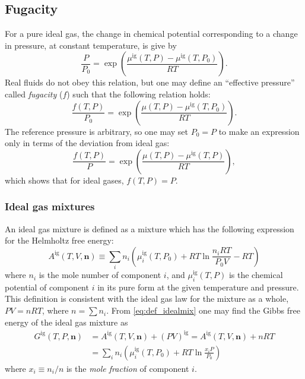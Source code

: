 \documentclass[english]{../thermomemo/thermomemo}
\newcommand*{\vektor}[1]{\boldsymbol{#1}}%
\begin{document}
\subsection{Fugacity}
For a pure ideal gas, the change in chemical potential corresponding to a change in pressure, at constant temperature, is give by 
\begin{equation}
  \frac{P}{P_0} = \exp\left( \frac{\mu^\text{ig}(T,P) - \mu^\text{ig}(T,P_0) }{RT} \right).
  \label{}
\end{equation}
Real fluids do not obey this relation, but one may define an ``effective pressure'' called 
\textit{fugacity} ($f$) such that the following relation holds:
\begin{equation}
  \frac{f(T,P)}{P_0} = \exp\left( \frac{\mu(T,P) - \mu^\text{ig}(T,P_0) }{RT} \right).
  \label{}
\end{equation}
The reference pressure is arbitrary, so one may set $P_0=P$ to make an expression only in terms of the deviation from ideal gas:
\begin{equation}
  \frac{f(T,P)}{P} = \exp\left( \frac{\mu(T,P) - \mu^\text{ig}(T,P) }{RT} \right),
  \label{}
\end{equation}
which shows that for ideal gases, $f(T,P)=P$.



\subsubsection{Ideal gas mixtures}
An ideal gas mixture is defined as a mixture which has the following expression for the Helmholtz free energy:
\begin{equation}
  A^\text{ig}(T,V,\vektor{n}) \equiv \sum_i n_i \left( 
  \mu_i^\text{ig}(T,P_0) + RT\ln \frac{n_i RT}{P_0 V} - RT
  \right)
  \label{eq:def_idealmix}
\end{equation}
where $n_i$ is the mole number of component $i$, and
$\mu^\text{ig}_i(T,P)$ is the chemical potential of component $i$ in its pure form 
at the given temperature and pressure. This definition is consistent with the ideal gas law for the mixture as a whole, 
$PV=nRT$, where $n=\sum n_i$.
From \eqref{eq:def_idealmix} one may find the Gibbs free energy of the 
ideal gas mixture as
\begin{align}
  G^\text{ig}(T,P,\vektor{n}) 
  &= A^\text{ig}(T,V,\vektor{n}) + \left( PV \right)^\text{ig} = A^\text{ig}(T,V,\vektor{n}) + nRT \nonumber\\
  &= \sum_i n_i \left( 
  \mu_i^\text{ig}(T,P_0) + RT\ln \frac{x_i P}{P_0}
  \right)
  \label{eq:G_idealmix}
\end{align}
where $x_i \equiv n_i/n$ is the \textit{mole fraction} of component $i$.
\end{document}
